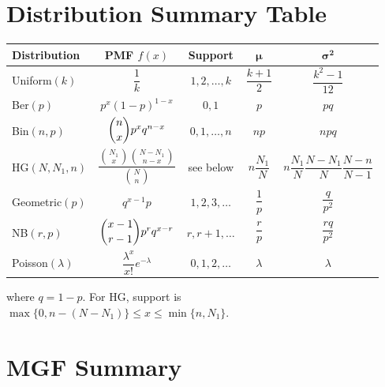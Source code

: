 \documentclass{article}
\theoremstyle{remark}
\newlength{\subsecindent}
\newenvironment{secbody}{%
  \begin{list}{}{%
    \setlength{\leftmargin}{\subsecindent}%
    \setlength{\rightmargin}{0pt}%
    \setlength{\topsep}{0pt}%
    \setlength{\partopsep}{0pt}%
    \setlength{\parsep}{\parskip}%
    \setlength{\itemsep}{\parskip}%
  }\item\relax
}{\end{list}}
\begin{document}
\section{Distribution Summary Table}
\label{sec:ov-table}

\begin{secbody}

\begin{center}
\renewcommand{\arraystretch}{1.8}
\begin{tabular}{@{}lcccc@{}}
\toprule
\textbf{Distribution} & \textbf{PMF} $f(x)$ & \textbf{Support} & $\boldsymbol{\mu}$ & $\boldsymbol{\sigma^2}$ \\
\midrule
Uniform$(k)$
  & $\dfrac{1}{k}$
  & $1, 2, \ldots, k$
  & $\dfrac{k+1}{2}$
  & $\dfrac{k^2 - 1}{12}$ \\[4pt]
Ber$(p)$
  & $p^x (1-p)^{1-x}$
  & $0, 1$
  & $p$
  & $pq$ \\[4pt]
Bin$(n,p)$
  & $\dbinom{n}{x} p^x q^{n-x}$
  & $0, 1, \ldots, n$
  & $np$
  & $npq$ \\[4pt]
HG$(N, N_1, n)$
  & $\dfrac{\binom{N_1}{x}\binom{N-N_1}{n-x}}{\binom{N}{n}}$
  & see below
  & $n\dfrac{N_1}{N}$
  & $n\dfrac{N_1}{N}\dfrac{N-N_1}{N}\dfrac{N-n}{N-1}$ \\[4pt]
Geometric$(p)$
  & $q^{x-1} p$
  & $1, 2, 3, \ldots$
  & $\dfrac{1}{p}$
  & $\dfrac{q}{p^2}$ \\[4pt]
NB$(r, p)$
  & $\dbinom{x-1}{r-1} p^r q^{x-r}$
  & $r, r+1, \ldots$
  & $\dfrac{r}{p}$
  & $\dfrac{rq}{p^2}$ \\[4pt]
Poisson$(\lambda)$
  & $\dfrac{\lambda^x}{x!} e^{-\lambda}$
  & $0, 1, 2, \ldots$
  & $\lambda$
  & $\lambda$ \\
\bottomrule
\end{tabular}
\end{center}
where $q = 1 - p$. For HG, support is $\max\{0, n-(N-N_1)\} \le x \le \min\{n, N_1\}$.

\end{secbody}

\section{MGF Summary}
\label{sec:ov-mgf}
\end{document}
